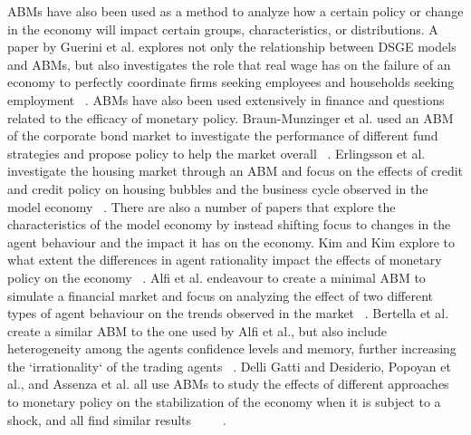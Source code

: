 \documentclass[11pt]{article}
\begin{document}
ABMs have also been used as a method to analyze how a certain policy or change
in the economy will impact certain groups, characteristics, or distributions.
A paper by Guerini et al. explores not only the relationship between DSGE models
and ABMs, but also investigates the role that real wage has on the failure of an
economy to perfectly coordinate firms seeking employees and households seeking
employment ~\cite{Guerini-wage-paper}. ABMs have also been used extensively in
finance and questions related to the efficacy of monetary policy. Braun-Munzinger et al.
used an ABM of the corporate bond market to investigate the performance of different
fund strategies and propose policy to help the market overall ~\cite{Braun-Munzinger-bond-paper}.
Erlingsson et al. investigate the housing market through an ABM and focus on the
effects of credit and credit policy on housing bubbles and the business cycle
observed in the model economy ~\cite{Erlingsson-housing-paper}. There are also a
number of papers that explore the characteristics of the model economy by instead
shifting focus to changes in the agent behaviour and the impact it has on the
economy. Kim and Kim explore to what extent the differences in agent rationality
impact the effects of monetary policy on the economy ~\cite{Kim-herding-paper}.
Alfi et al. endeavour to create a minimal ABM to simulate a financial market and
focus on analyzing the effect of two different types of agent behaviour on the
trends observed in the market ~\cite{Alfi-minimal-paper}. Bertella et al. create
a similar ABM to the one used by Alfi et al., but also include heterogeneity
among the agents confidence levels and memory, further increasing the `irrationality`
of the trading agents ~\cite{Bertella-memory-paper}. Delli Gatti and Desiderio,
Popoyan et al., and Assenza et al. all use ABMs to study the effects of different
approaches to monetary policy on the stabilization of the economy when it is
subject to a shock, and all find similar results ~\cite{Delli-Gatti-monetary-paper} ~\cite{Popoyan-monetary-paper} ~\cite{Assenza-monetary-paper}.
\end{document}

